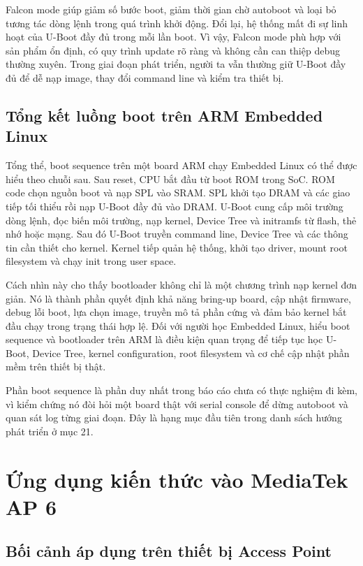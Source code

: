 \documentclass[11pt]{article}
\begin{document}
Falcon mode giúp giảm số bước boot, giảm thời gian chờ autoboot và loại bỏ tương tác dòng lệnh trong quá trình khởi động. Đổi lại, hệ thống mất đi sự linh hoạt của U-Boot đầy đủ trong mỗi lần boot. Vì vậy, Falcon mode phù hợp với sản phẩm ổn định, có quy trình update rõ ràng và không cần can thiệp debug thường xuyên. Trong giai đoạn phát triển, người ta vẫn thường giữ U-Boot đầy đủ để dễ nạp image, thay đổi command line và kiểm tra thiết bị.

\subsection{Tổng kết luồng boot trên ARM Embedded Linux}

Tổng thể, boot sequence trên một board ARM chạy Embedded Linux có thể được hiểu theo chuỗi sau. Sau reset, CPU bắt đầu từ boot ROM trong SoC. ROM code chọn nguồn boot và nạp SPL vào SRAM. SPL khởi tạo DRAM và các giao tiếp tối thiểu rồi nạp U-Boot đầy đủ vào DRAM. U-Boot cung cấp môi trường dòng lệnh, đọc biến môi trường, nạp kernel, Device Tree và initramfs từ flash, thẻ nhớ hoặc mạng. Sau đó U-Boot truyền command line, Device Tree và các thông tin cần thiết cho kernel. Kernel tiếp quản hệ thống, khởi tạo driver, mount root filesystem và chạy init trong user space.

Cách nhìn này cho thấy bootloader không chỉ là một chương trình nạp kernel đơn giản. Nó là thành phần quyết định khả năng bring-up board, cập nhật firmware, debug lỗi boot, lựa chọn image, truyền mô tả phần cứng và đảm bảo kernel bắt đầu chạy trong trạng thái hợp lệ. Đối với người học Embedded Linux, hiểu boot sequence và bootloader trên ARM là điều kiện quan trọng để tiếp tục học U-Boot, Device Tree, kernel configuration, root filesystem và cơ chế cập nhật phần mềm trên thiết bị thật.

Phần boot sequence là phần duy nhất trong báo cáo chưa có thực nghiệm đi kèm, vì kiểm chứng nó đòi hỏi một board thật với serial console để dừng autoboot và quan sát log từng giai đoạn. Đây là hạng mục đầu tiên trong danh sách hướng phát triển ở mục 21.

\section{Ứng dụng kiến thức vào MediaTek AP 6}

\subsection{Bối cảnh áp dụng trên thiết bị Access Point}
\end{document}
